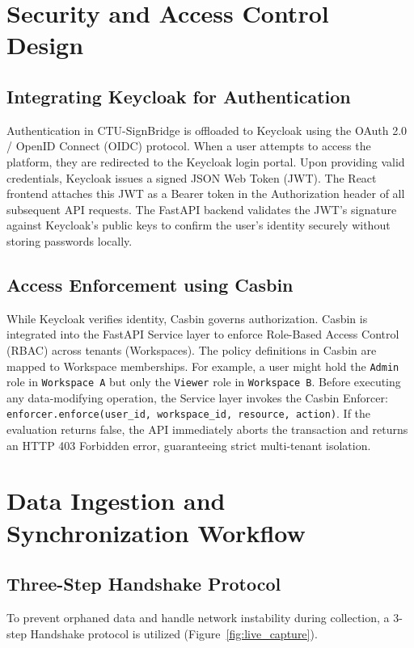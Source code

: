 \section{Security and Access Control Design}

\subsection{Integrating Keycloak for Authentication}
Authentication in CTU-SignBridge is offloaded to Keycloak using the OAuth 2.0 / OpenID Connect (OIDC) protocol. When a user attempts to access the platform, they are redirected to the Keycloak login portal. Upon providing valid credentials, Keycloak issues a signed JSON Web Token (JWT). The React frontend attaches this JWT as a Bearer token in the Authorization header of all subsequent API requests. The FastAPI backend validates the JWT's signature against Keycloak's public keys to confirm the user's identity securely without storing passwords locally.

\subsection{Access Enforcement using Casbin}
While Keycloak verifies identity, Casbin governs authorization. Casbin is integrated into the FastAPI Service layer to enforce Role-Based Access Control (RBAC) across tenants (Workspaces). 
The policy definitions in Casbin are mapped to Workspace memberships. For example, a user might hold the \texttt{Admin} role in \texttt{Workspace A} but only the \texttt{Viewer} role in \texttt{Workspace B}. Before executing any data-modifying operation, the Service layer invokes the Casbin Enforcer:
\texttt{enforcer.enforce(user\_id, workspace\_id, resource, action)}. 
If the evaluation returns false, the API immediately aborts the transaction and returns an HTTP 403 Forbidden error, guaranteeing strict multi-tenant isolation.

\section{Data Ingestion and Synchronization Workflow}

\subsection{Three-Step Handshake Protocol}
To prevent orphaned data and handle network instability during collection, a 3-step Handshake protocol is utilized (Figure~\ref{fig:live_capture}).

